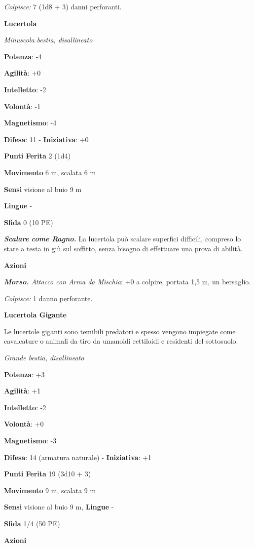 \begin{multicols}{2}
\emph{Colpisce:} 7 (1d8 + 3) danni perforanti.

\textbf{Lucertola}

\emph{Minuscola bestia, disallineato}

\textbf{Potenza}: -4

\textbf{Agilità}: +0

\textbf{Intelletto}: -2

\textbf{Volontà}: -1

\textbf{Magnetismo}: -4

\textbf{Difesa}: 11 - \textbf{Iniziativa}: +0

\textbf{Punti Ferita} 2 (1d4)

\textbf{Movimento} 6 m, scalata 6 m

\textbf{Sensi} visione al buio 9 m

\textbf{Lingue} -

\textbf{Sfida} 0 (10 PE)

\emph{\textbf{Scalare come Ragno.}} La lucertola può scalare superfici
difficili, compreso lo stare a testa in giù sul soffitto, senza bisogno
di effettuare una prova di abilità.

\textbf{Azioni}

\emph{\textbf{Morso.} Attacco con Arma da Mischia}: +0 a colpire,
portata 1,5 m, un bersaglio.

\emph{Colpisce:} 1 danno perforante.

\textbf{Lucertola Gigante}

Le lucertole giganti sono temibili predatori e spesso vengono impiegate
come cavalcature o animali da tiro da umanoidi rettiloidi e residenti
del sottosuolo.

\emph{Grande bestia, disallineato}

\textbf{Potenza}: +3

\textbf{Agilità}: +1

\textbf{Intelletto}: -2

\textbf{Volontà}: +0

\textbf{Magnetismo}: -3

\textbf{Difesa}: 14 (armatura naturale) - \textbf{Iniziativa}: +1

\textbf{Punti Ferita} 19 (3d10 + 3)

\textbf{Movimento} 9 m, scalata 9 m

\textbf{Sensi} visione al buio 9 m, 
\textbf{Lingue} -

\textbf{Sfida} 1/4 (50 PE)

\textbf{Azioni}


\end{multicols}
